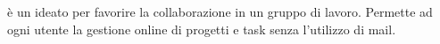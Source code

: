 

 è un  ideato per favorire la collaborazione in un gruppo di lavoro. Permette ad ogni utente la gestione online di progetti e task senza l'utilizzo di mail.